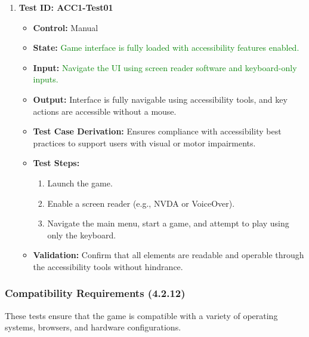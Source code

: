 \documentclass[12pt]{article}
\newcommand{\added}[1]{\textcolor{green}{#1}}
\begin{document}
\begin{enumerate}
    \item \textbf{Test ID: ACC1-Test01}
    \begin{itemize}
        \item \textbf{Control:} Manual
        \item \textbf{State:} \added{Game interface is fully loaded with accessibility features enabled.}
        \item \textbf{Input:} \added{Navigate the UI using screen reader software and keyboard-only inputs.}
        \item \textbf{Output:} Interface is fully navigable using accessibility tools, and key actions are accessible without a mouse.
        \item \textbf{Test Case Derivation:} Ensures compliance with accessibility best practices to support users with visual or motor impairments.
        \item \textbf{Test Steps:}
        \begin{enumerate}
            \item Launch the game.
            \item Enable a screen reader (e.g., NVDA or VoiceOver).
            \item Navigate the main menu, start a game, and attempt to play using only the keyboard.
        \end{enumerate}
        \item \textbf{Validation:} Confirm that all elements are readable and operable through the accessibility tools without hindrance.
    \end{itemize}
\end{enumerate}

\subsubsection{Compatibility Requirements (4.2.12)}

These tests ensure that the game is compatible with a variety of operating systems, browsers, and hardware configurations.
\end{document}
